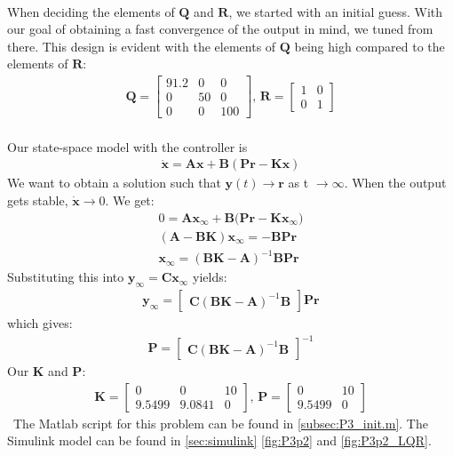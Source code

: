\\When deciding the elements of $\mathbf{Q}$ and $\mathbf{R}$, we started with an initial guess. With our goal of obtaining a fast convergence of the output in mind, we tuned from there. This design is evident with the elements of $\mathbf{Q}$ being high compared to the elements of $\mathbf{R}$:
\begin{gather*}
    \mathbf{Q} = \begin{bmatrix}
    91.2 & 0 & 0 \\ 
    0 & 50 & 0 \\
    0 & 0 & 100 \end{bmatrix}\textbf{, } \mathbf{R} = \begin{bmatrix} 1 & 0 \\ 0 & 1 \end{bmatrix}
\end{gather*}
\\Our state-space model with the controller is
\begin{gather*}
     \mathbf{\dot{x}} = \mathbf{Ax} + \mathbf{B}(\mathbf{Pr} - \mathbf{Kx})
\end{gather*}
We want to obtain a solution such that  \( \mathbf{y}(t) \rightarrow \mathbf{r} \)  as t \(\rightarrow \infty\). When the output gets stable,  
\(\mathbf{\dot{x}} \rightarrow 0\). We get:
\begin{gather*}
    0 = \mathbf{Ax_\infty} + \mathbf{B}(\mathbf{Pr} - \mathbf{Kx_\infty)} \\
    (\mathbf{A} - \mathbf{BK})\mathbf{x_\infty} = -\mathbf{BPr} \\
    \mathbf{x_\infty} = (\mathbf{BK} - \mathbf{A})^{-1}
    \mathbf{BPr}
\end{gather*}
Substituting this into \(\mathbf{y_\infty} = \mathbf{Cx_\infty}\) yields:      
\begin{gather*}
    \mathbf{y_\infty} = 
    \begin{bmatrix} \mathbf{C}(\mathbf{BK} - \mathbf{A})^{-1} \mathbf{B}\end{bmatrix}\mathbf{Pr}
\end{gather*}
which gives:
\begin{gather*}
    \mathbf{P} = 
    \begin{bmatrix}\mathbf{C}(\mathbf{BK} - \mathbf{A})^{-1}\mathbf{B}\end{bmatrix}^{-1}
\end{gather*}
Our \textbf{K} and \textbf{P}:
\begin{gather*}
    \mathbf{K} = \begin{bmatrix}
    0 & 0 & 10 \\
    9.5499 & 9.0841 & 0 \end{bmatrix}\textbf{, } \mathbf{P} =
    \begin{bmatrix} 0 & 10 \\ 9.5499 & 0 \end{bmatrix}
\end{gather*}
\ The Matlab script for this problem can be found in \cref{subsec:P3_init.m}. The Simulink model can be found in \cref{sec:simulink} \cref{fig:P3p2} and \cref{fig:P3p2_LQR}.

